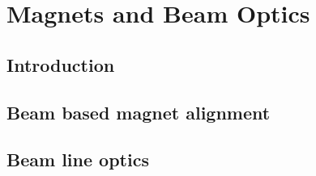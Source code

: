 \graphicspath{{10-Magnets-and-beam-optics/Figures/}}

\section{Magnets and Beam Optics}
\label{Sect:Magnets}

\subsection{Introduction}
\label{SubSect:Magnets_Intro}

\subsection{Beam based magnet alignment}
\label{SubSect:Magnets_alignment}

\subsection{Beam line optics}
\label{SubSect:BL}



